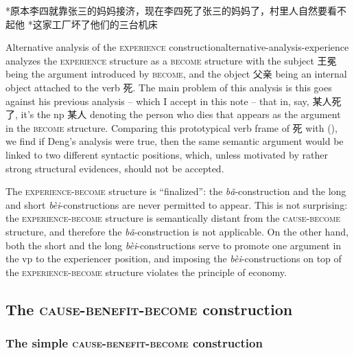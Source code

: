 \documentclass[UTF8, a4paper, oneside, scheme=plain, 12pt]{ctexrep}
\newcommand*{\citesec}[1]{\S~{#1}}
\newcommand{\form}[1]{\emph{#1}}
\newcommand*{\category}[1]{\textsc{#1}}
\begin{document}
\begin{exe}
    \ex\label{ex:verb-phrase.experience.3} *原本李四就靠张三的妈妈接济，现在李四死了张三的妈妈了，村里人自然要看不起他
    \ex\label{ex:verb-phrase.experience-4} *这家工厂坏了他们的三台机床
\end{exe}

\begin{infobox}{Alternative analysis of the \category{experience} construction}{alternative-analysis-experience}
    \citet[\citesec{212}]{deng2010formal} analyzes the \category{experience} structure 
    as a \category{become} structure with 
    the subject 王冕 being the argument introduced by \category{become},
    and the object 父亲 being an internal object attached to the verb 死.
    The main problem of this analysis is 
    this goes against his previous analysis -- 
    which I accept in this note -- 
    that in, say, 某人死了, it's the \acs{np} 某人 denoting the person who dies that 
    appears as the argument in the \category{become} structure.
    Comparing this prototypical verb frame of 死 
    with (),
    we find if Deng's analysis were true,
    then the same semantic argument would be linked to two different syntactic positions,
    which, unless motivated by rather strong structural evidences, 
    should not be accepted.
\end{infobox}

The \category{experience}-\category{become} structure is ``finalized'':
the \form{bǎ}-construction and the long and short \form{bèi}-constructions
are never permitted to appear.
This is not surprising:
the \category{experience}-\category{become} structure 
is semantically distant from the \category{cause}-\category{become} structure,
and therefore the \form{bǎ}-construction 
is not applicable.
On the other hand,
both the short and the long \form{bèi}-constructions 
serve to promote one argument in the \acs{vp} 
to the experiencer position,
and imposing the \form{bèi}-constructions 
on top of the \category{experience}-\category{become} structure
violates the principle of economy.

\subsection{The \category{cause}-\category{benefit}-\category{become} construction}
\label{sec:verb-phrase.dative}

\subsubsection{The simple \category{cause}-\category{benefit}-\category{become} construction}
\end{document}
